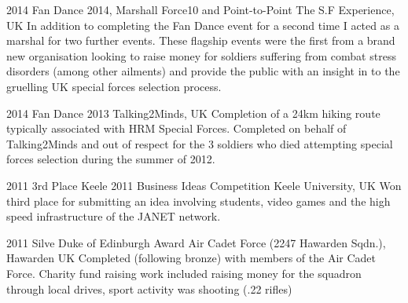 \documentclass[]{friggeri-cv} %
\begin{document}
\begin{entrylist}


\entry
{2014}
{Fan Dance 2014, Marshall Force10 and Point-to-Point}
{The S.F Experience, UK}
{In addition to completing the Fan Dance event for a second time I acted as a
marshal for two further events. These flagship events were the first
from a brand new organisation looking to raise money for soldiers
suffering from combat stress disorders (among other ailments) and
provide the public with an insight in to the gruelling UK special
forces selection process.}


\entry
{2014}
{Fan Dance 2013}
{Talking2Minds, UK}
{Completion of a 24km hiking route typically associated with HRM Special
Forces. Completed on behalf of Talking2Minds and out of respect for the 3
soldiers who died attempting special forces selection during the summer of
2012.}


\entry
{2011}
{3rd Place Keele 2011 Business Ideas Competition}
{Keele University, UK}
{Won third place for submitting an idea involving students, video games and
the high speed infrastructure of the JANET network.}


\entry
{2011}
{Silve Duke of Edinburgh Award}
{Air Cadet Force (2247 Hawarden Sqdn.), Hawarden UK}
{Completed (following bronze) with members of the Air Cadet Force. Charity
fund raising work included raising money for the squadron through local
drives, sport activity was shooting (.22 rifles)}


\end{entrylist}


%
%
%
%
%
%
%
\end{document}
